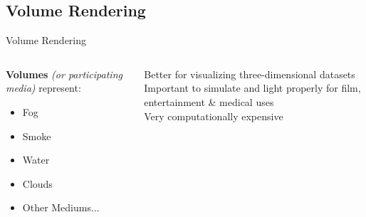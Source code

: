 \documentclass[10pt,compress,professionalfont]{beamer}
\begin{document}
\subsection{Volume Rendering}
\begin{frame}{Volume Rendering}

    \begin{columns}
        \begin{column}{0.5\textwidth}
            {\bf Volumes} \textit{(or participating media)} represent:
            \begin{itemize}
                \item Fog
                \item Smoke
                \item Water
                \item Clouds
                \item Other Mediums...
            \end{itemize}

        \end{column}
        \begin{column}{0.5\textwidth}
            Better for visualizing three-dimensional datasets\\
            \vspace{4mm}
            Important to simulate and light properly for film, entertainment \& medical uses\\
            \vspace{4mm}
            Very computationally expensive \\ 
        \end{column}
    \end{columns}

\end{frame}
\end{document}
